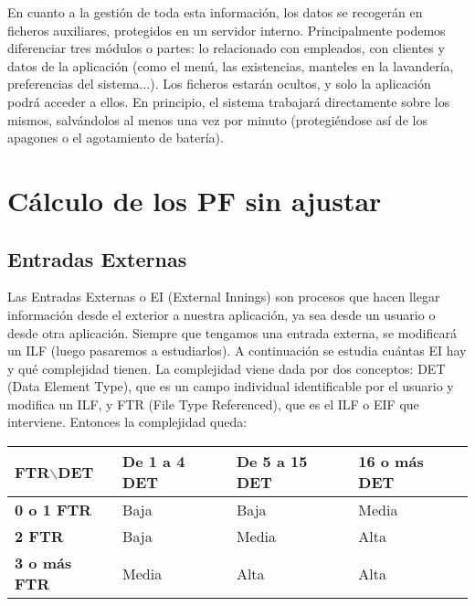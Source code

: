 \documentclass[spanish,a4paper,12pt]{report}	%
\begin{document}
En cuanto a la gestión de toda esta información, los datos se recogerán en ficheros auxiliares, protegidos en un servidor interno. Principalmente podemos diferenciar tres módulos o partes: lo relacionado con empleados, con clientes y datos de la aplicación (como el menú, las existencias, manteles en la lavandería, preferencias del sistema...). Los ficheros estarán ocultos, y solo la aplicación podrá acceder a ellos. En principio, el sistema trabajará directamente sobre los mismos, salvándolos al menos una vez por minuto (protegiéndose así de los apagones o el agotamiento de batería).

\section{Cálculo de los PF sin ajustar}
	\subsection{Entradas Externas}
	Las Entradas Externas o EI (External Innings) son procesos que hacen llegar información desde el exterior a nuestra aplicación, ya sea desde un usuario o desde otra aplicación. Siempre que tengamos una entrada externa, se modificará un ILF (luego pasaremos a estudiarlos). A continuación se estudia cuántas EI hay y qué complejidad tienen. La complejidad viene dada por dos conceptos: DET (Data Element Type), que es un campo individual identificable por el usuario y modifica un ILF, y FTR (File Type Referenced), que es el ILF o EIF que interviene. Entonces la complejidad queda: 

\vspace{0.35cm}

			\begin{tabular}{|p{3cm}||p{3cm}|p{3.2cm}|p{3cm}|}
				\hline
				\textbf{FTR$\backslash$DET} & \textbf{De 1 a 4 DET} & \textbf{De 5 a 15 DET} & \textbf{16  o más DET} \\ \hline \hline
				\textbf{0 o 1 FTR} & Baja & Baja & Media \\ \hline 
				\textbf{2 FTR} & Baja & Media & Alta \\ \hline 
				\textbf{3 o más FTR} & Media & Alta & Alta \\ \hline 
			\end{tabular}

\vspace{0.35cm}
\end{document}
